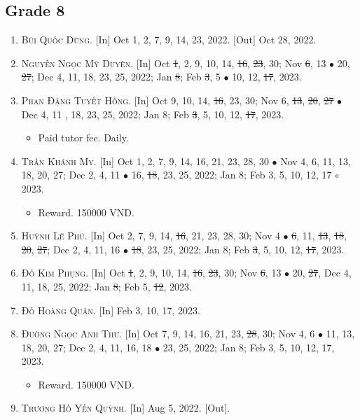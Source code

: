 \documentclass{article}
\numberwithin{equation}{section}
\begin{document}
\subsection{Grade 8}

\begin{enumerate}
	\item \textsc{Bùi Quốc Dũng.} \textsf{[In]} Oct 1, 2, 7, 9, 14, 23, 2022. \textsf{[Out]} Oct 28, 2022.
	\item \textsc{Nguyễn Ngọc Mỹ Duyên.} \textsf{[In]} Oct \st{1}, 2, 9, 10, 14, \st{16}, \st{23}, 30; Nov \st{6}, 13 $\bullet$ 20, \st{27}; Dec 4, 11, 18, 23, 25, 2022; Jan \st{8}; Feb \st{3}, 5 $\bullet$ 10, 12, \st{17}, 2023.
	\item \textsc{Phan Đặng Tuyết Hồng.} \textsf{[In]} Oct 9, 10, 14, \st{16}, 23, 30; Nov 6, \st{13}, \st{20}, \st{27} $\bullet$ Dec 4, 11 , 18, 23, 25, 2022; Jan 8; Feb \st{3}, 5, 10, 12, \st{17}, 2023.
	\begin{itemize}
		\item \textsf{Paid tutor fee.} Daily.
	\end{itemize}
	\item \textsc{Trần Khánh My.} \textsf{[In]} Oct 1, 2, 7, 9, 14, 16, 21, 23, 28, 30 $\bullet$ Nov 4, 6, 11, 13, 18, 20, 27; Dec 2, 4, 11 $\bullet$ 16, \st{18}, 23, 25, 2022; Jan 8; Feb 3, 5, 10, 12, 17 $\circ$ 2023.
	\begin{itemize}
		\item \textsf{Reward.} 150000 VND.
	\end{itemize}
	\item \textsc{Huỳnh Lê Phú.} \textsf{[In]} Oct 2, 7, 9, 14, \st{16}, 21, 23, 28, 30; Nov 4 $\bullet$ \st{6}, 11, \st{13}, \st{18}, \st{20}, \st{27}; Dec 2, 4, 11, 16 $\bullet$ \st{18}, 23, 25, 2022; Jan 8; Feb \st{3}, 5, 10, 12, \st{17}, 2023.
	\item \textsc{Đỗ Kim Phụng.} \textsf{[In]} Oct \st{1}, 2, 9, 10, 14, \st{16}, \st{23}, 30; Nov \st{6}, 13 $\bullet$ 20, \st{27}, Dec 4, 11, 18, 25, 2022; Jan \st{8}; Feb 5, \st{12}, 2023.
	\item \textsc{Đỗ Hoàng Quân.} \textsf{[In]} Feb 3, 10, 17, 2023.
	\item \textsc{Đường Ngọc Anh Thư.} \textsf{[In]} Oct 7, 9, 14, 16, 21, 23, \st{28}, 30; Nov 4, 6 $\bullet$ 11, 13, 18, 20, 27; Dec 2, 4, 11, 16, 18 $\bullet$ 23, 25, 2022; Jan 8; Feb 3, 5, 10, 12, 17, 2023.
	\begin{itemize}
		\item \textsf{Reward.} 150000 VND.
	\end{itemize}
	\item \textsc{Trương Hồ Yến Quỳnh.} \textsf{[In]} Aug 5, 2022. \textsf{[Out]}.
\end{enumerate}
\end{document}
